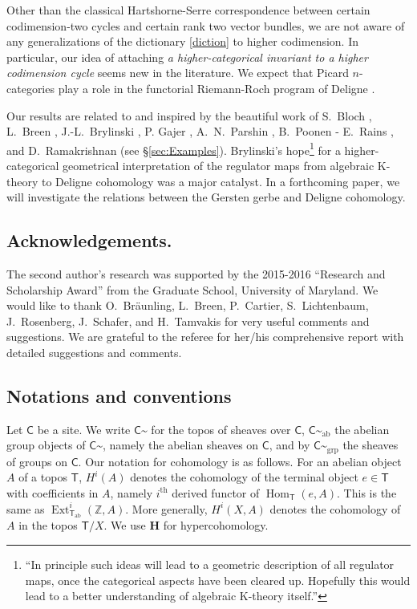 \documentclass{amsart}
\numberwithin{equation}{subsection}
\theoremstyle{remark}
\theoremstyle{remark}
\newcommand{\bbZ}{\mathbb{Z}}
\newcommand{\C}{\mathsf{C}} %
\DeclareMathOperator{\Ext}{Ext}
\newcommand{\HH}{\mathbf{H}} %
\DeclareMathOperator{\Hom}{Hom}
\newcommand{\shC}{\C\sptilde} %
\newcommand{\shAbC}{\shC_\mathrm{ab}} %
\newcommand{\shGrpC}{\shC_\mathrm{grp}} %
\newcommand{\T}{\mathsf{T}} %
\begin{document}
Other than the classical Hartshorne-Serre correspondence between certain
codimension-two cycles and certain rank two vector bundles, we are not aware of
any generalizations of the dictionary \eqref{diction} to higher codimension. In particular, our
idea of attaching \emph{a higher-categorical invariant to a higher codimension
  cycle} seems new in the literature. We expect that Picard $n$-categories play
a role in the functorial Riemann-Roch program of Deligne \cite{Deligne0}.

Our results are related to and inspired by the beautiful work of S.~Bloch \cite{Bloch}, L.~Breen \cite{Breen99}, J.-L.~Brylinski \cite{Brylinski}, P. Gajer \cite{Gajer1, Gajer2}, A.~N.~Parshin \cite{Parshin}, B.~Poonen - E.~Rains \cite{PoonenRains}, and D.~Ramakrishnan \cite{Ramakrishnan} (see \S \ref{sec:Examples}).  Brylinski's hope\footnote{``In principle such ideas will lead to a geometric description of all regulator maps, once the categorical aspects have been cleared up. Hopefully this would lead to a better understanding of algebraic K-theory itself.''} \cite[Introduction]{Brylinski} for a higher-categorical geometrical interpretation of the  regulator maps from algebraic K-theory to  Deligne cohomology was a major catalyst.  In a forthcoming paper, we will  investigate the  relations between the Gersten gerbe and Deligne cohomology. 

\subsection*{Acknowledgements.} The second author's research was supported by the  2015-2016 ``Research and Scholarship Award''  from the
Graduate School, University of Maryland. We would like to thank O.~Br\"aunling, L.~Breen, P.~Cartier, S.~Lichtenbaum, J.~Rosenberg, J.~Schafer, and H.~Tamvakis for very useful comments and suggestions. We are grateful to the referee for her/his comprehensive report with detailed suggestions and comments.


\subsection*{Notations and conventions} Let $\C$ be a site. We write $\shC$ for
the topos of sheaves over $\C$, $\shAbC$ the abelian group objects of $\shC$,
namely the abelian sheaves on $\C$, and by $\shGrpC$ the sheaves of groups on
$\C$. Our notation for cohomology is as follows. For an abelian object $A$ of a
topos $\T$, $H^i(A)$ denotes the cohomology of the terminal object $e\in\T$ with
coefficients in $A$, namely $i^\mathrm{th}$ derived functor of
$\Hom_\T(e,A)$. This is the same as $\Ext^i_{\T_\mathrm{ab}}(\bbZ,A)$.  More
generally, $H^i(X,A)$ denotes the cohomology of $A$ in the topos $\T/X$. We use
$\HH$ for hypercohomology.
\end{document}
